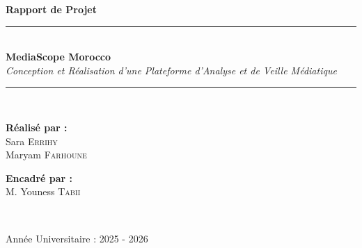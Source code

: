 \documentclass[12pt,a4paper,oneside]{report}
\begin{document}
\begin{titlepage}
    \begin{center}
        \vspace*{1cm}
        
        {\Large \textbf{Rapport de Projet}}\\[1.5cm]
        
        \rule{\linewidth}{1mm} \\[0.8cm]
        {\Huge \textbf{\textcolor{primary}{MediaScope Morocco}}} \\[0.5cm]
        {\Large \textit{\textcolor{textgray}{Conception et Réalisation d'une Plateforme d'Analyse et de Veille Médiatique}}} \\[0.6cm]
        \rule{\linewidth}{1mm} \\[3cm]
        
        \begin{minipage}{0.45\textwidth}
            \begin{flushleft} \large
                \textbf{\textcolor{primary}{Réalisé par :}}\\
                \vspace{0.2cm}
                Sara \textsc{Errihy}\\
                Maryam \textsc{Farhoune}
            \end{flushleft}
        \end{minipage}
        \hfill
        \begin{minipage}{0.45\textwidth}
            \begin{flushright} \large
                \textbf{\textcolor{primary}{Encadré par :}} \\
                \vspace{0.2cm}
                M. Youness \textsc{Tabii}
            \end{flushright}
        \end{minipage}\\[4cm]
        
        \vfill
        
        {\large \textcolor{textgray}{Année Universitaire : 2025 - 2026}}
        
    \end{center}
\end{titlepage}

\newpage
{}

\end{document}
